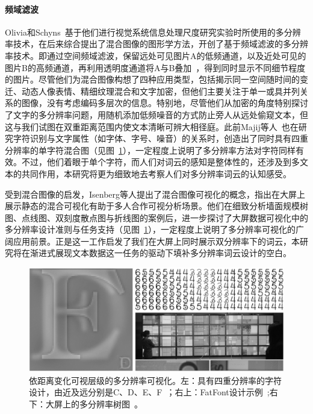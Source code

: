 \paragraph{频域滤波}Olivia和Schyns~\supercite{Olivia2006}基于他们进行视觉系统信息处理尺度研究实验时所使用的多分辨率技术，在后来综合提出了混合图像的图形学方法，开创了基于频域滤波的多分辨率技术。即通过空间频域滤波，保留远处可见图片A的低频通道，以及近处可见的图片B的高频通道，再利用透明度通道将A与B叠加~\supercite{Baudisch2004}，得到同时显示不同细节程度的图片。尽管他们为混合图像构想了四种应用类型，包括揭示同一空间随时间的变迁、动态人像表情、精细纹理混合和文字加密，但他们主要关注于单一或具并列关系的图像，没有考虑编码多层次的信息。特别地，尽管他们从加密的角度特别探讨了文字的多分辨率问题，用随机添加低频噪音的方式防止旁人从远处偷窥文本，但这与我们试图在双重距离范围内使文本清晰可辨大相径庭。此前Majij等人~\supercite{Majaj2002}也在研究字符识别与文字属性（如字体、字号、噪音）的关系时，创造出了同时具有四重分辨率的单字符混合图（见图~\ref{fig:nres}），一定程度上说明了多分辨率方法对字符同样有效。不过，他们着眼于单个字符，而人们对词云的感知是整体性的，还涉及到多文本的共同作用，本研究将更为细致地去考察人们对多分辨率词云的认知感受。

受到混合图像的启发，Isenberg等人\supercite{Isenberg2013}提出了混合图像可视化的概念，指出在大屏上展示静态的混合可视化有助于多人合作可视分析场景。他们在细致分析墙面规模树图、点线图、双刻度散点图与折线图的案例后，进一步探讨了大屏数据可视化中的多分辨率设计准则与任务支持（见图~\ref{fig:nres}），一定程度上说明了多分辨率可视化的广阔应用前景。正是这一工作启发了我们在大屏上同时展示双分辨率下的词云，本研究将在渐进式展现文本数据这一任务的驱动下填补多分辨率词云设计的空白。


\begin{figure}[htbp]
	\centering
	\includegraphics[width=\textwidth]{figures/nres.png}
	\caption{依距离变化可视层级的多分辨率可视化。左：具有四重分辨率的字符设计，由近及远分别是C、D、E、F~\supercite{Majaj2002}；右上：FatFont设计示例~\supercite{Miguel2012};右下：大屏上的多分辨率树图~\supercite{Isenberg2013}。}
	\label{fig:nres}
\end{figure}


